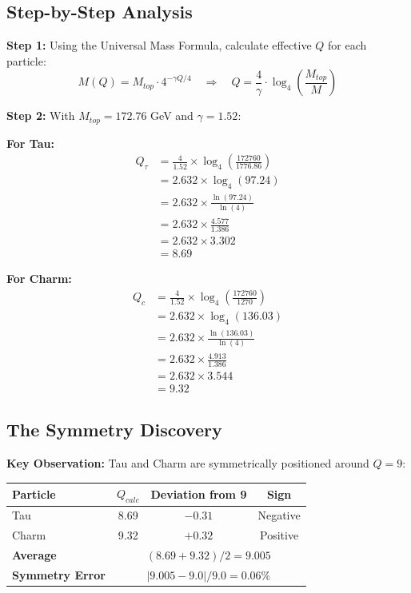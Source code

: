 \documentclass[11pt, a4paper]{article}
\theoremstyle{remark}
\begin{document}
\subsection{Step-by-Step Analysis}

\textbf{Step 1:} Using the Universal Mass Formula, calculate effective $Q$ for each particle:
\begin{equation}
M(Q) = M_{top} \cdot 4^{-\gamma Q/4} \quad \Rightarrow \quad Q = \frac{4}{\gamma} \cdot \log_4\left(\frac{M_{top}}{M}\right)
\end{equation}

\textbf{Step 2:} With $M_{top} = 172.76$ GeV and $\gamma = 1.52$:

\textbf{For Tau:}
\begin{align}
Q_\tau &= \frac{4}{1.52} \times \log_4\left(\frac{172760}{1776.86}\right) \\
&= 2.632 \times \log_4(97.24) \\
&= 2.632 \times \frac{\ln(97.24)}{\ln(4)} \\
&= 2.632 \times \frac{4.577}{1.386} \\
&= 2.632 \times 3.302 \\
&= \boxed{8.69}
\end{align}

\textbf{For Charm:}
\begin{align}
Q_c &= \frac{4}{1.52} \times \log_4\left(\frac{172760}{1270}\right) \\
&= 2.632 \times \log_4(136.03) \\
&= 2.632 \times \frac{\ln(136.03)}{\ln(4)} \\
&= 2.632 \times \frac{4.913}{1.386} \\
&= 2.632 \times 3.544 \\
&= \boxed{9.32}
\end{align}

\subsection{The Symmetry Discovery}

\textbf{Key Observation:} Tau and Charm are symmetrically positioned around $Q = 9$:
\begin{table}[H]
\centering
\begin{tabular}{|l|c|c|c|}
\hline
\textbf{Particle} & \textbf{$Q_{calc}$} & \textbf{Deviation from 9} & \textbf{Sign} \\
\hline
Tau & 8.69 & $-0.31$ & Negative \\
Charm & 9.32 & $+0.32$ & Positive \\
\hline
\textbf{Average} & \multicolumn{3}{c|}{$(8.69 + 9.32)/2 = 9.005$} \\
\textbf{Symmetry Error} & \multicolumn{3}{c|}{$|9.005 - 9.0|/9.0 = 0.06\%$} \\
\hline
\end{tabular}
\end{table}
\end{document}

